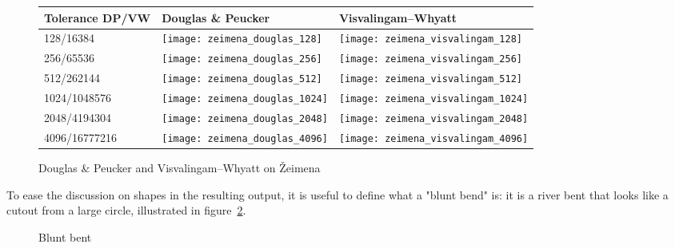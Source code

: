 \documentclass[a4paper]{article}
\newcommand{\DP}{Douglas \& Peucker}
\newcommand{\VW}{Visvalingam--Whyatt}
\begin{document}
\begin{figure}[H]
    \renewcommand{\tabularxcolumn}[1]{>{\center\small}m{#1}}
    \begin{tabularx}{\textwidth}{ p{2.1cm} | X | X | }
        Tolerance DP/VW                                                   &
        {\DP}                                                             &
        {\VW}                                                             \tabularnewline \hline

        128/16384                                                         &
        \texttt{[image: zeimena\_douglas\_128]}           &
        \texttt{[image: zeimena\_visvalingam\_128]}       \tabularnewline \hline

        256/65536                                                         &
        \texttt{[image: zeimena\_douglas\_256]}         &
        \texttt{[image: zeimena\_visvalingam\_256]}     \tabularnewline \hline

        512/262144                                                        &
        \texttt{[image: zeimena\_douglas\_512]}        &
        \texttt{[image: zeimena\_visvalingam\_512]}    \tabularnewline \hline

        1024/1048576                                                      &
        \texttt{[image: zeimena\_douglas\_1024]}      &
        \texttt{[image: zeimena\_visvalingam\_1024]}  \tabularnewline \hline

        2048/4194304                                                      &
        \texttt{[image: zeimena\_douglas\_2048]}     &
        \texttt{[image: zeimena\_visvalingam\_2048]} \tabularnewline \hline

        4096/16777216                                                     &
        \texttt{[image: zeimena\_douglas\_4096]}     &
        \texttt{[image: zeimena\_visvalingam\_4096]} \tabularnewline \hline
    \end{tabularx}
    \caption{{\DP} and {\VW} on Žeimena}
    \label{tab:comparison-zeimena}
\end{figure}

To ease the discussion on shapes in the resulting output, it is useful to
define what a "blunt bend" is: it is a river bent that looks like a cutout from
a large circle, illustrated in figure~\ref{fig:blunt-bent}.

\begin{figure}[h]
    \centering
    \caption{Blunt bent}
    \label{fig:blunt-bent}
\end{figure}
\end{document}
